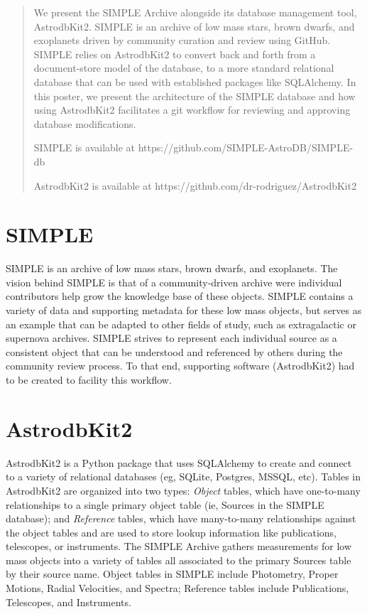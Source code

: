 \documentclass[11pt,twoside]{article}
\begin{document}
\begin{abstract}

We present the SIMPLE Archive alongside its database management tool, AstrodbKit2. SIMPLE is an archive of low mass stars, brown dwarfs, and exoplanets driven by community curation and review using GitHub. SIMPLE relies on AstrodbKit2 to convert back and forth from a document-store model of the database, to a more standard relational database that can be used with established packages like SQLAlchemy. In this poster, we present the architecture of the SIMPLE database and how using AstrodbKit2 facilitates a git workflow for reviewing and approving database modifications.

SIMPLE is available at https://github.com/SIMPLE-AstroDB/SIMPLE-db 

AstrodbKit2 is available at https://github.com/dr-rodriguez/AstrodbKit2
  
\end{abstract}

\section{SIMPLE}

SIMPLE is an archive of low mass stars, brown dwarfs, and exoplanets. The vision behind SIMPLE is that of a community-driven archive were individual contributors help grow the knowledge base of these objects. 
SIMPLE contains a variety of data and supporting metadata for these low mass objects, but serves as an example that can be adapted to other fields of study, such as extragalactic or supernova archives. 
SIMPLE strives to represent each individual source as a consistent object that can be understood and referenced by others during the community review process. To that end, supporting software (AstrodbKit2) had to be created to facility this workflow.

\section{AstrodbKit2}

AstrodbKit2 is a Python package that uses SQLAlchemy to create and connect to a variety of relational databases (eg, SQLite, Postgres, MSSQL, etc). Tables in AstrodbKit2 are organized into two types: \textit{Object} tables, which have one-to-many relationships to a single primary object table (ie, Sources in the SIMPLE database); and \textit{Reference} tables, which have many-to-many relationships against the object tables and are used to store lookup information like publications, telescopes, or instruments. The SIMPLE Archive gathers measurements for low mass objects into a variety of tables all associated to the primary Sources table by their source name. Object tables in SIMPLE include Photometry, Proper Motions, Radial Velocities, and Spectra; Reference tables include Publications, Telescopes, and Instruments.
\end{document}
